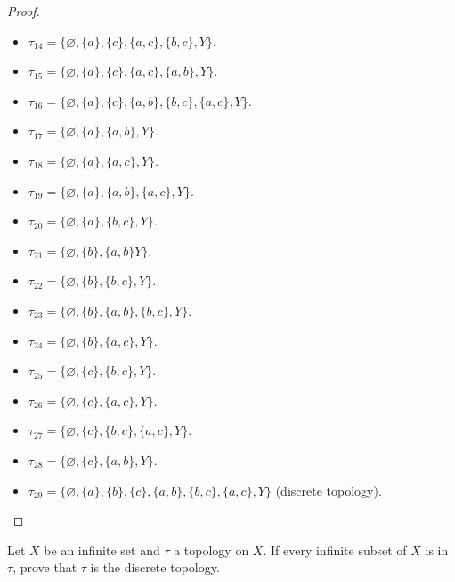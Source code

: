 \begin{proof}
\begin{enumerate}[label={(\alph*)}]
\begin{itemize}
                  \item $\tau_{14} = \{ \varnothing, \{ a \}, \{ c \}, \{ a, c \}, \{ b, c \}, Y \}$.
                  \item $\tau_{15} = \{ \varnothing, \{ a \}, \{ c \}, \{ a, c \}, \{ a, b \}, Y \}$.
                  \item $\tau_{16} = \{ \varnothing, \{ a \}, \{ c \}, \{ a, b \}, \{ b, c \}, \{ a, c \}, Y \}$.
                  \item $\tau_{17} = \{ \varnothing, \{ a \}, \{ a, b \}, Y \}$.
                  \item $\tau_{18} = \{ \varnothing, \{ a \}, \{ a, c \}, Y \}$.
                  \item $\tau_{19} = \{ \varnothing, \{ a \}, \{ a, b \}, \{ a, c \}, Y \}$.
                  \item $\tau_{20} = \{ \varnothing, \{ a \}, \{ b, c \}, Y \}$.
                  \item $\tau_{21} = \{ \varnothing, \{ b \}, \{ a, b \} Y \}$.
                  \item $\tau_{22} = \{ \varnothing, \{ b \}, \{ b, c \}, Y \}$.
                  \item $\tau_{23} = \{ \varnothing, \{ b \}, \{ a, b \}, \{ b, c \}, Y \}$.
                  \item $\tau_{24} = \{ \varnothing, \{ b \}, \{ a, c \}, Y \}$.
                  \item $\tau_{25} = \{ \varnothing, \{ c \}, \{ b, c \}, Y \}$.
                  \item $\tau_{26} = \{ \varnothing, \{ c \}, \{ a, c \}, Y \}$.
                  \item $\tau_{27} = \{ \varnothing, \{ c \}, \{ b, c \}, \{ a, c \}, Y \}$.
                  \item $\tau_{28} = \{ \varnothing, \{ c \}, \{ a, b \}, Y \}$.
                  \item $\tau_{29} = \{ \varnothing, \{ a \}, \{ b \}, \{ c \}, \{ a, b \}, \{ b, c \}, \{ a, c \}, Y \}$ (discrete topology).
              \end{itemize}
    \end{enumerate}
\end{proof}
\newpage

\begin{exercise}
    Let $X$ be an infinite set and $\tau$ a topology on $X$. If every infinite subset of $X$ is in $\tau$, prove that $\tau$ is the discrete topology.
\end{exercise}


